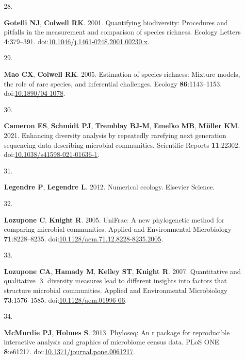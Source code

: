 \documentclass[
]{article}
\newlength{\cslhangindent}
\newlength{\csllabelwidth}
\newlength{\cslentryspacingunit} %
\newenvironment{CSLReferences}[2] %
 {%
  \setlength{\parindent}{0pt}
  \ifodd #1
  \let\oldpar\par
  \def\par{\hangindent=\cslhangindent\oldpar}
  \fi
  \setlength{\parskip}{#2\cslentryspacingunit}
 }%
 {}
\newcommand{\CSLLeftMargin}[1]{\parbox[t]{\csllabelwidth}{#1}}
\newcommand{\CSLRightInline}[1]{\parbox[t]{\linewidth - \csllabelwidth}{#1}\break}
\begin{document}
\begin{CSLReferences}{0}{1}
\leavevmode{}%
\CSLLeftMargin{28. }%
\CSLRightInline{\textbf{Gotelli NJ}, \textbf{Colwell RK}. 2001.
Quantifying biodiversity: Procedures and pitfalls in the measurement and
comparison of species richness. Ecology Letters \textbf{4}:379--391.
doi:\href{https://doi.org/10.1046/j.1461-0248.2001.00230.x}{10.1046/j.1461-0248.2001.00230.x}.}

\leavevmode{}%
\CSLLeftMargin{29. }%
\CSLRightInline{\textbf{Mao CX}, \textbf{Colwell RK}. 2005. Estimation
of species richness: Mixture models, the role of rare species, and
inferential challenges. Ecology \textbf{86}:1143--1153.
doi:\href{https://doi.org/10.1890/04-1078}{10.1890/04-1078}.}

\leavevmode{}%
\CSLLeftMargin{30. }%
\CSLRightInline{\textbf{Cameron ES}, \textbf{Schmidt PJ},
\textbf{Tremblay BJ-M}, \textbf{Emelko MB}, \textbf{Müller KM}. 2021.
Enhancing diversity analysis by repeatedly rarefying next generation
sequencing data describing microbial communities. Scientific Reports
\textbf{11}:22302.
doi:\href{https://doi.org/10.1038/s41598-021-01636-1}{10.1038/s41598-021-01636-1}.}

\leavevmode{}%
\CSLLeftMargin{31. }%
\CSLRightInline{\textbf{Legendre P}, \textbf{Legendre L}. 2012.
Numerical ecology. Elsevier Science.}

\leavevmode{}%
\CSLLeftMargin{32. }%
\CSLRightInline{\textbf{Lozupone C}, \textbf{Knight R}. 2005. {UniFrac}:
A new phylogenetic method for comparing microbial communities. Applied
and Environmental Microbiology \textbf{71}:8228--8235.
doi:\href{https://doi.org/10.1128/aem.71.12.8228-8235.2005}{10.1128/aem.71.12.8228-8235.2005}.}

\leavevmode{}%
\CSLLeftMargin{33. }%
\CSLRightInline{\textbf{Lozupone CA}, \textbf{Hamady M}, \textbf{Kelley
ST}, \textbf{Knight R}. 2007. Quantitative and qualitative \(\upbeta\)
diversity measures lead to different insights into factors that
structure microbial communities. Applied and Environmental Microbiology
\textbf{73}:1576--1585.
doi:\href{https://doi.org/10.1128/aem.01996-06}{10.1128/aem.01996-06}.}

\leavevmode{}%
\CSLLeftMargin{34. }%
\CSLRightInline{\textbf{McMurdie PJ}, \textbf{Holmes S}. 2013. Phyloseq:
An r package for reproducible interactive analysis and graphics of
microbiome census data. {PLoS} {ONE} \textbf{8}:e61217.
doi:\href{https://doi.org/10.1371/journal.pone.0061217}{10.1371/journal.pone.0061217}.}


\end{CSLReferences}
\end{document}
